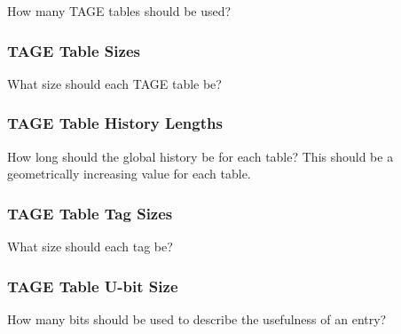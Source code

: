 How many TAGE tables should be used?

\subsubsection{TAGE Table Sizes}

What size should each TAGE table be?

\subsubsection{TAGE Table History Lengths}

How long should the global history be for each table? This should be a geometrically increasing value for each table.

\subsubsection{TAGE Table Tag Sizes}

What size should each tag be?

\subsubsection{TAGE Table U-bit Size}

How many bits should be used to describe the usefulness of an entry?

